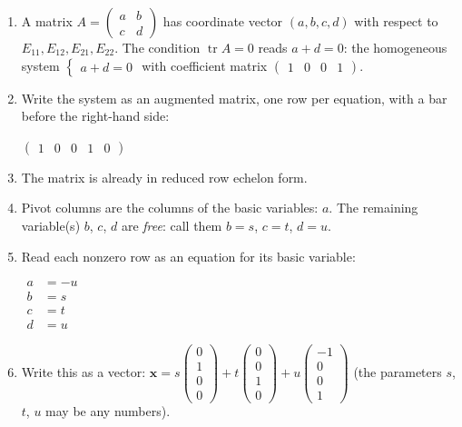 \documentclass[11pt]{article}
\begin{document}
\begin{tcolorbox}[breakable,colback=ans,colframe=ansb,boxrule=0.5pt,left=4pt,right=4pt,top=2pt,bottom=2pt]\begin{enumerate}[leftmargin=3.1em,itemsep=1pt,topsep=1pt,label=\textbf{Step \arabic*.}]\item A matrix $A=\begin{pmatrix}a&b\\c&d\end{pmatrix}$ has coordinate vector $(a,b,c,d)$ with respect to $E_{11},E_{12},E_{21},E_{22}$. The condition $\operatorname{tr}A=0$ reads $a+d=0$: the homogeneous system $\begin{cases}a+d=0\end{cases}$ with coefficient matrix $\begin{pmatrix}1&0&0&1\end{pmatrix}$.
\item Write the system as an augmented matrix, one row per equation, with a bar before the right-hand side:\par\smallskip $\displaystyle \left(\begin{array}{cccc|c}1 & 0 & 0 & 1 & 0\end{array}\right)$
\item The matrix is already in reduced row echelon form.
\item Pivot columns are the columns of the basic variables: $a$. The remaining variable(s) $b$, $c$, $d$ are \emph{free}: call them $b=s$, $c=t$, $d=u$.
\item Read each nonzero row as an equation for its basic variable:\par\smallskip $\displaystyle\begin{aligned}a&=-u\\ b&=s\\ c&=t\\ d&=u\end{aligned}$
\item Write this as a vector: $\displaystyle \mathbf x=s\begin{pmatrix}0\\1\\0\\0\end{pmatrix}+t\begin{pmatrix}0\\0\\1\\0\end{pmatrix}+u\begin{pmatrix}-1\\0\\0\\1\end{pmatrix}$ (the parameters $s$, $t$, $u$ may be any numbers).

\end{enumerate}
\end{tcolorbox}
\end{document}
